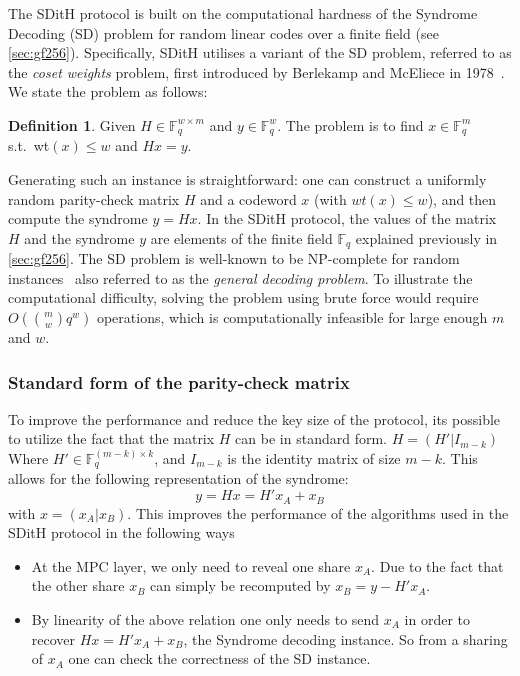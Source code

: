 \documentclass[11pt]{report}
\theoremstyle{definition}
\newtheorem{definition}{Definition}[section]
\theoremstyle{plain}
\begin{document}
The SDitH protocol is built on the computational hardness of the Syndrome Decoding (SD) problem for random linear codes over a finite field (see \autoref{sec:gf256}). Specifically, SDitH utilises a variant of the SD problem, referred to as the \textit{coset weights} problem, first introduced by Berlekamp and McEliece in 1978~\cite{berlekamp1978inherent}. We state the problem as follows:

\begin{definition}\label{def:syndrome}
  Given $H \in \mathbb{F}^{w\times m}_q$ and $y \in \mathbb{F}^{w}_q$. The problem is to find $x \in \mathbb{F}^m_q$ s.t.\ wt$(x) \leq w$ and $Hx = y$.
\end{definition}

Generating such an instance is straightforward: one can construct a uniformly random parity-check matrix $H$ and a codeword $x$ (with $wt(x) \leq w$), and then compute the syndrome $y = Hx$. In the SDitH protocol, the values of the matrix $H$ and the syndrome $y$ are elements of the finite field $\mathbb{F}_q$ explained previously in \autoref{sec:gf256}. The SD problem is well-known to be NP-complete for random instances~\cite{berlekamp1978inherent} also referred to as the \textit{general decoding problem}. To illustrate the computational difficulty, solving the problem using brute force would require $O(\binom{m}{w} q^w)$ operations, which is computationally infeasible for large enough $m$ and $w$.

\subsubsection{Standard form of the parity-check matrix}\label{sub:standard_form_of_the_parity_check_matrix}
To improve the performance and reduce the key size of the protocol, its possible to utilize the fact that the matrix $H$ can be in standard form. $H = (H'|I_{m-k}) $ Where $H' \in \mathbb{F}^{(m-k)\times k}_q$, and $I_{m-k}$ is the identity matrix of size $m-k$. This allows for the following representation of the syndrome:
\begin{equation}
  y = Hx = H'x_A + x_B\label{eq:standard_form_of_the_parity_check_matrix}
\end{equation}
with $x = (x_A | x_B)$. This improves the performance of the algorithms used in the SDitH protocol in the following ways
\begin{itemize}
  \item At the MPC layer, we only need to reveal one share $x_A$. Due to the fact that the other share $x_B$ can simply be recomputed by $x_B = y - H'x_A$.
  \item By linearity of the above relation one only needs to send $x_A$ in order to recover $Hx = H'x_A + x_B$, the Syndrome decoding instance. So from a sharing of $x_A$ one can check the correctness of the SD instance.
\end{itemize}
\end{document}
